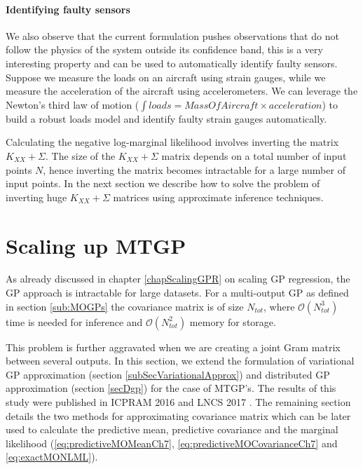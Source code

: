 \paragraph{Identifying faulty sensors}
We also observe that the current formulation pushes observations that do not follow the physics of the system outside its confidence band, this is a very interesting property and can be used to automatically identify faulty sensors. Suppose we measure the loads on an aircraft using strain gauges, while we measure the acceleration of the aircraft using accelerometers. We can leverage the Newton's third law of motion ($\int loads = MassOfAircraft \times acceleration$) to build a robust loads model and identify faulty strain gauges automatically. 

Calculating the negative log-marginal likelihood involves inverting the matrix \(K_{XX} + \Sigma\). The size of the \(K_{XX} + \Sigma\) matrix depends on a total number of input points \(N\), hence inverting the matrix becomes intractable for a large number of input points. In the next section we describe how to solve the problem of inverting huge \(K_{XX} + \Sigma\) matrices using approximate inference techniques.

\section{Scaling up MTGP}\label{sec:sparseGPRegression}
As already discussed in chapter \ref{chapScalingGPR} on scaling GP regression, the GP approach is intractable for large datasets. For a multi-output GP as defined in section \ref{sub:MOGPs} the covariance matrix is of size \(N_{tot}\),  where \(\mathcal{O}\left ( N_{tot}^{3} \right )\) time is needed for inference and \(\mathcal{O}\left ( N_{tot}^{2} \right )\) memory for storage. 

This problem is further aggravated when we are creating a joint Gram matrix between several outputs. In this section, we extend the formulation of variational GP approximation (section \ref{subSecVariationalApprox}) and distributed GP approximation (section \ref{secDgp}) for the case of MTGP's. The results of this study were published in ICPRAM 2016 and LNCS 2017 \cite{icpram16Ankit, oatao18000}. The remaining section details the two methods for approximating covariance matrix which can be later used to calculate the predictive mean, predictive covariance and the marginal likelihood (\ref{eq:predictiveMOMeanCh7}, \ref{eq:predictiveMOCovarianceCh7} and \ref{eq:exactMONLML}).

